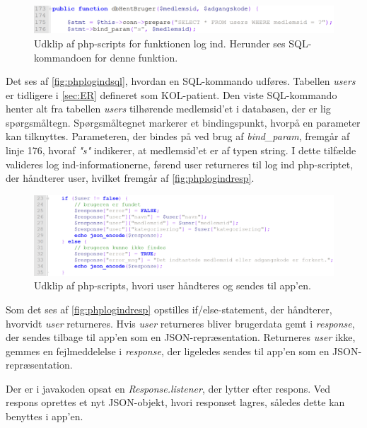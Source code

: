 \begin{figure} [H]
\centering
\includegraphics[width=1\textwidth]{figures/imple/phplogindsql}
\caption{Udklip af php-scripts for funktionen log ind. Herunder ses SQL-kommandoen for denne funktion.}
\label{fig:phplogindsql}
\end{figure}

\noindent
Det ses af \autoref{fig:phplogindsql}, hvordan en SQL-kommando udføres. Tabellen \textit{users} er tidligere i \autoref{sec:ER} defineret som KOL-patient. Den viste SQL-kommando henter alt fra tabellen \textit{users} tilhørende medlemsid'et i databasen, der er lig spørgsmåltegn. Spørgsmåltegnet markerer et bindingspunkt, hvorpå en parameter kan tilknyttes. Parameteren, der bindes på ved brug af \textit{bind\_param}, fremgår af linje 176, hvoraf \textit{"s"} indikerer, at medlemsid'et er af typen string. I dette tilfælde valideres log ind-informationerne, førend user returneres til log ind php-scriptet, der håndterer user, hvilket fremgår af \autoref{fig:phplogindresp}.


\begin{figure} [H]
\centering
\includegraphics[width=1\textwidth]{figures/imple/phplogindresp}
\caption{Udklip af php-scripts, hvori user håndteres og sendes til app'en.}
\label{fig:phplogindresp}
\end{figure}

\noindent
Som det ses af \autoref{fig:phplogindresp} opstilles if/else-statement, der håndterer, hvorvidt \textit{user} returneres. Hvis \textit{user} returneres bliver brugerdata gemt i \textit{response}, der sendes tilbage til app'en som en JSON-repræsentation. Returneres \textit{user} ikke, gemmes en fejlmeddelelse i \textit{response}, der ligeledes sendes til app'en som en JSON-repræsentation. 

Der er i javakoden opsat en \textit{Response.listener}, der lytter efter respons. Ved respons oprettes et nyt JSON-objekt, hvori responset lagres, således dette kan benyttes i app'en. 


